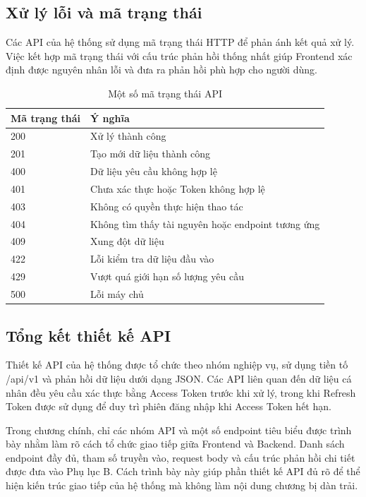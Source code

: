 \documentclass[12pt, a4paper]{report}
\begin{document}
\subsection{Xử lý lỗi và mã trạng thái}Các API của hệ thống sử dụng mã trạng thái HTTP để phản ánh kết quả xử lý. Việc kết hợp mã trạng thái với cấu trúc phản hồi thống nhất giúp Frontend xác định được nguyên nhân lỗi và đưa ra phản hồi phù hợp cho người dùng.

\begin{table}[htbp]
\centering
\caption{Một số mã trạng thái API}
\begin{tabular}{|p{5cm}|p{10cm}|}
\hline
\textbf{Mã trạng thái} & \textbf{Ý nghĩa} \\
\hline
200 & Xử lý thành công \\
\hline
201 & Tạo mới dữ liệu thành công \\
\hline
400 & Dữ liệu yêu cầu không hợp lệ \\
\hline
401 & Chưa xác thực hoặc Token không hợp lệ \\
\hline
403 & Không có quyền thực hiện thao tác \\
\hline
404 & Không tìm thấy tài nguyên hoặc endpoint tương ứng \\
\hline
409 & Xung đột dữ liệu \\
\hline
422 & Lỗi kiểm tra dữ liệu đầu vào \\
\hline
429 & Vượt quá giới hạn số lượng yêu cầu \\
\hline
500 & Lỗi máy chủ \\
\hline
\end{tabular}
\end{table}

\subsection{Tổng kết thiết kế API}Thiết kế API của hệ thống được tổ chức theo nhóm nghiệp vụ, sử dụng tiền tố /api/v1 và phản hồi dữ liệu dưới dạng JSON. Các API liên quan đến dữ liệu cá nhân đều yêu cầu xác thực bằng Access Token trước khi xử lý, trong khi Refresh Token được sử dụng để duy trì phiên đăng nhập khi Access Token hết hạn.

Trong chương chính, chỉ các nhóm API và một số endpoint tiêu biểu được trình bày nhằm làm rõ cách tổ chức giao tiếp giữa Frontend và Backend. Danh sách endpoint đầy đủ, tham số truyền vào, request body và cấu trúc phản hồi chi tiết được đưa vào Phụ lục B. Cách trình bày này giúp phần thiết kế API đủ rõ để thể hiện kiến trúc giao tiếp của hệ thống mà không làm nội dung chương bị dàn trải.
\end{document}
